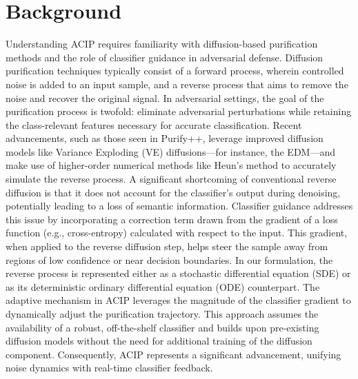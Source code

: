 \documentclass{article} %
\begin{document}
\section{Background}
\label{sec:background}
Understanding ACIP requires familiarity with diffusion-based purification methods and the role of classifier guidance in adversarial defense. Diffusion purification techniques typically consist of a forward process, wherein controlled noise is added to an input sample, and a reverse process that aims to remove the noise and recover the original signal. In adversarial settings, the goal of the purification process is twofold: eliminate adversarial perturbations while retaining the class-relevant features necessary for accurate classification. Recent advancements, such as those seen in Purify++, leverage improved diffusion models like Variance Exploding (VE) diffusions---for instance, the EDM---and make use of higher-order numerical methods like Heun's method to accurately simulate the reverse process. A significant shortcoming of conventional reverse diffusion is that it does not account for the classifier's output during denoising, potentially leading to a loss of semantic information. Classifier guidance addresses this issue by incorporating a correction term drawn from the gradient of a loss function (e.g., cross-entropy) calculated with respect to the input. This gradient, when applied to the reverse diffusion step, helps steer the sample away from regions of low confidence or near decision boundaries. In our formulation, the reverse process is represented either as a stochastic differential equation (SDE) or as its deterministic ordinary differential equation (ODE) counterpart. The adaptive mechanism in ACIP leverages the magnitude of the classifier gradient to dynamically adjust the purification trajectory. This approach assumes the availability of a robust, off-the-shelf classifier and builds upon pre-existing diffusion models without the need for additional training of the diffusion component. Consequently, ACIP represents a significant advancement, unifying noise dynamics with real-time classifier feedback.
\end{document}
